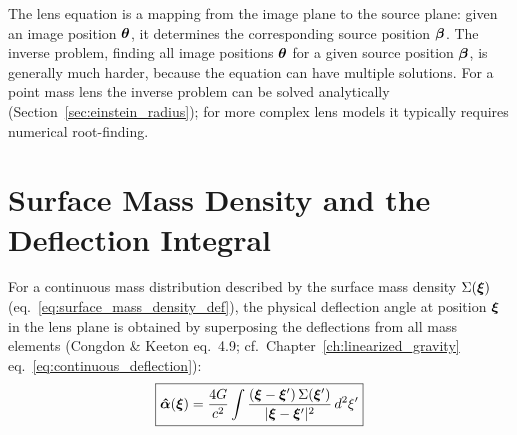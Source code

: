 \begin{remark}
The lens equation is a mapping from the image plane to the source plane:
given an image position $\boldsymbol{\theta}$, it determines the corresponding
source position $\boldsymbol{\beta}$.  The inverse problem, finding all image positions $\boldsymbol{\theta}$ for a given
source position $\boldsymbol{\beta}$, is
generally much harder, because the equation can have multiple solutions.
For a point mass lens the inverse problem can be solved analytically
(Section~\ref{sec:einstein_radius}); for more complex lens models it
typically requires numerical root-finding.
\end{remark}


\section{Surface Mass Density and the Deflection Integral}
\label{sec:surface_mass_density}

For a continuous mass distribution described by the surface mass density
$\Sigma(\boldsymbol{\xi})$ (eq.~\ref{eq:surface_mass_density_def}), the physical
deflection angle at position $\boldsymbol{\xi}$ in the lens plane is obtained by
superposing the deflections from all mass elements
(Congdon \& Keeton eq.~4.9; cf.\ Chapter~\ref{ch:linearized_gravity}
eq.~\ref{eq:continuous_deflection}):
\begin{equation}
    \boxed{
    \boldsymbol{\hat{\alpha}}(\boldsymbol{\xi}) = \frac{4G}{c^2}
    \int \frac{(\boldsymbol{\xi} - \boldsymbol{\xi}')\, \Sigma(\boldsymbol{\xi}')}
    {|\boldsymbol{\xi} - \boldsymbol{\xi}'|^2}\, d^2\xi'
    }
    \label{eq:deflection_integral_continuous}
\end{equation}

